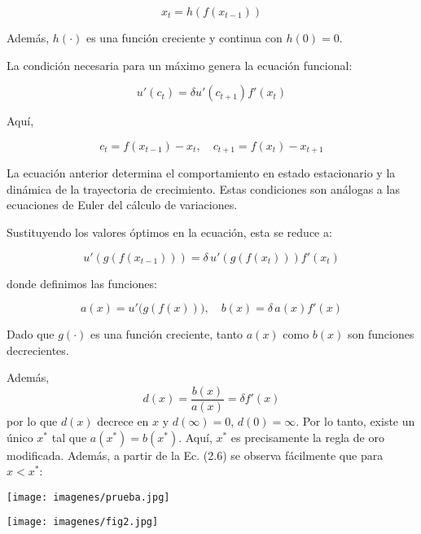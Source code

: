 \documentclass[a4paper,12pt]{article}
\begin{document}
		\begin{equation}
	x_t = h(f(x_{t-1}))
		\end{equation}
	
	Además, $h(\cdot)$ es una función creciente y continua con $h(0) = 0$.
	
	La condición necesaria para un máximo genera la ecuación funcional:
	
		\begin{equation}
	u'(c_t) = \delta u'(c_{t+1}) f'(x_t)
		\end{equation}
	
	Aquí,
	
		\begin{equation}
	c_t = f(x_{t-1}) - x_t, \quad c_{t+1} = f(x_t) - x_{t+1}
		\end{equation}
	
	La ecuación anterior determina el comportamiento en estado estacionario y la dinámica de la trayectoria de crecimiento. Estas condiciones son análogas a las ecuaciones de Euler del cálculo de variaciones.
	
	Sustituyendo los valores óptimos en la ecuación, esta se reduce a:
	
		\begin{equation}
u'\left(g\left(f(x_{t-1})\right)\right) = \delta \, u'\left(g\left(f(x_t)\right)\right) f'(x_t)
		\end{equation}
	
	donde definimos las funciones:
	
		\begin{equation}
a(x) = u'\bigl(g(f(x))\bigr), \quad b(x) = \delta \, a(x) f'(x)
		\end{equation}
	
	Dado que $g(\cdot)$ es una función creciente, tanto $a(x)$ como $b(x)$ son funciones decrecientes.
	
Además, 
		\begin{equation}
d(x) = \frac{b(x)}{a(x)} = \delta f'(x)
		\end{equation}
por lo que \( d(x) \) decrece en \( x \) y \( d(\infty) = 0 \), \( d(0) = \infty \). Por lo tanto, existe un único \( x^* \) tal que \( a(x^*) = b(x^*) \). Aquí, \( x^* \) es precisamente la regla de oro modificada. Además, a partir de la Ec. (2.6) se observa fácilmente que para \( x < x^* \):

	\begin{center}
		\begin{minipage}{0.48\linewidth}
			\centering
			\texttt{[image: imagenes/prueba.jpg]}
		\end{minipage}
		\hfill
		\begin{minipage}{0.48\linewidth}
			\centering
			\texttt{[image: imagenes/fig2.jpg]}
		\end{minipage}
	\end{center}
	
\end{document}
